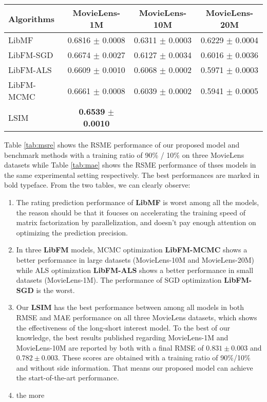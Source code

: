 \documentclass{sig-alternate-05-2015}
\begin{document}
\begin{table*}[htpb]
	\centering
	\caption{MAE Performance comparison of our proposed model and benchmark models
    with a training ratio of 90\%/10\% on three MovieLens datasets.}
	\label{tab:mae}
	\begin{tabular}{|l|c|c|c|}
		\hline
		\textbf{Algorithms} & \textbf{MovieLens-1M} & \textbf{MovieLens-10M} & \textbf{MovieLens-20M} \\
		\hline
		LibMF      & 0.6816 $\pm$ 0.0008 & 0.6311 $\pm$ 0.0003 & 0.6229 $\pm$ 0.0004 \\
		LibFM-SGD  & 0.6674 $\pm$ 0.0027 & 0.6127 $\pm$ 0.0034 & 0.6016 $\pm$ 0.0036 \\
		LibFM-ALS  & 0.6609 $\pm$ 0.0010 & 0.6068 $\pm$ 0.0002 & 0.5971 $\pm$ 0.0003 \\
        LibFM-MCMC & 0.6661 $\pm$ 0.0008 & 0.6039 $\pm$ 0.0002 & 0.5941 $\pm$ 0.0005 \\
		LSIM       & \textbf{0.6539} $\pm$ \textbf{0.0010} &  & \\
		\hline
	\end{tabular}
\end{table*}

Table \ref{tab:msre} shows the RSME performance of our proposed model and benchmark methods 
with a training ratio of 90\% / 10\% on three MovieLens datasets while Table \ref{tab:mae}
shows the RSME performance of thses models in the same experimental setting respectively.
The best performances are marked in bold typeface.
From the two tables, we can clearly observe:
\begin{enumerate}
\item The rating prediction performance of \textbf{LibMF} is worst among all the models,
the reason should be that it foucses on accelerating the training speed of matrix
factorization by parallelization, and doesn't pay enough attention on optimizing
the prediction precision.
\item In three \textbf{LibFM} models, MCMC optimization \textbf{LibFM-MCMC} shows
a better performance in large datasets (MovieLens-10M and MovieLens-20M) while
ALS optimization \textbf{LibFM-ALS} shows a better performance in small datasets
(MovieLens-1M). The performance of SGD optimization \textbf{LibFM-SGD} is the worst.
\item Our \textbf{LSIM} has the best performance between among all models in both RMSE
and MAE performance on all three MovieLens datasets, which shows the effectiveness
of the long-short interest model. To the best of our knowledge, the best results
published regarding MovieLens-1M and MovieLens-10M are reported by both
\cite{lee2013local, sedhain2015autorec} with a final RMSE of $0.831 \pm 0.003$
and $0.782 \pm 0.003$. These scores are obtained with a training ratio of
90\%/10\% and without side information. That means our proposed model can achieve
the start-of-the-art performance.
\item the more
\end{enumerate}
\end{document}
